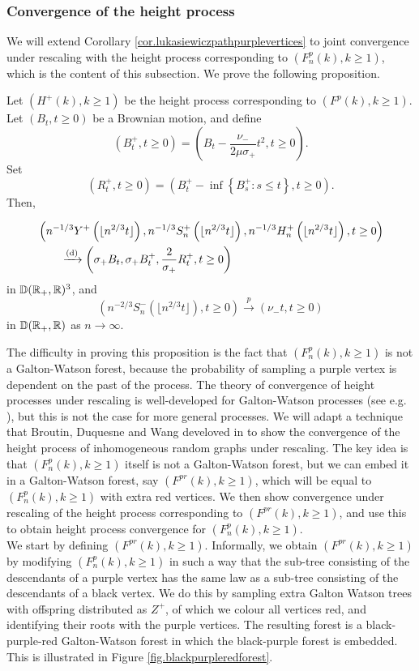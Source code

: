 \subsubsection{Convergence of the height process}\label{subsubsec.convheightprocess}
We will extend Corollary \ref{cor.lukasiewiczpathpurplevertices} to joint convergence under rescaling with the height process corresponding to $(F^p_n(k),k\geq 1)$, which is the content of this subsection. We prove the following proposition. 
\begin{proposition}\label{prop.convheightprocesspurple}
Let $(H^{+}(k),k\geq 1)$ be the height process corresponding to $(F^p(k),k\geq 1)$. Let $(B_t,t\geq 0)$ be a Brownian motion, and define 
$$({B}^+_t,t\geq 0)=\left(B_t-\frac{\nu_-}{2\mu\sigma_+}t^2,t\geq 0\right).$$ 
Set $$(R^+_t,t\geq 0)=\left({B}^+_t-\inf\left\{{B}^+_s: s\leq t\right\},t\geq 0 \right).$$
Then,

\begin{align*}&\left(n^{-1/3}Y^{+}\left(\lfloor n^{2/3}t\rfloor\right), n^{-1/3}S^{+}_n\left(\lfloor n^{2/3}t\rfloor\right),n^{-1/3}H^{+}_n\left(\lfloor n^{2/3}t\rfloor\right), t\geq 0\right) \\
&\qquad \xrightarrow[]{\mathrm{(d)}}\left(\sigma_+B_t,\sigma_+{B}^+_t, \frac{2}{\sigma_+} R^+_t,  t\geq 0\right)\end{align*}
 in ${\mathbb D}({\mathbb R}_+,{\mathbb R})^3$, and 
 $$\left(n^{-2/3}S^{-}_n\left(\lfloor n^{2/3}t\rfloor\right),t\geq 0\right)\overset{p}{\to}\left(\nu_- t,t\geq 0\right)$$
 in ${\mathbb D}({\mathbb R}_+,{\mathbb R})$ as $n\to\infty$.
\end{proposition}

The difficulty in proving this proposition is the fact that $(F^p_n(k),k\geq 1)$ is not a Galton-Watson forest, because the probability of sampling a purple vertex is dependent on the past of the process. The theory of convergence of height processes under rescaling is well-developed for Galton-Watson processes (see e.g. \cite{AST_2002__281__R1_0}), but this is not the case for more general processes.  We will adapt a technique that Broutin, Duquesne and Wang develoved in \cite{broutinLimitsMultiplicativeInhomogeneous2020} to show the convergence of the height process of inhomogeneous random graphs under rescaling. The key idea is that  $(F^p_n(k),k\geq 1)$ itself is not a Galton-Watson forest, but we can embed it in a Galton-Watson forest, say $(F^{pr}(k),k\geq 1)$, which will be equal to $(F^p_n(k),k\geq 1)$ with extra red vertices. We then show convergence under rescaling of the height process corresponding to $(F^{pr}(k),k\geq 1)$, and use this to obtain height process convergence for $(F^p_n(k),k\geq 1)$. \\
We start by defining $(F^{pr}(k),k\geq 1)$. Informally, we obtain $(F^{pr}(k),k\geq 1)$ by modifying $(F^p_n(k),k\geq 1)$ in such a way that the sub-tree consisting of the descendants of a purple vertex has the same law as a sub-tree consisting of the descendants of a black vertex. We do this by sampling extra Galton Watson trees with offspring distributed as $Z^+$, of which we colour all vertices red, and identifying their roots with the purple vertices. The resulting forest is a black-purple-red Galton-Watson forest in which the black-purple forest is embedded. This is illustrated in Figure \ref{fig.blackpurpleredforest}. 

